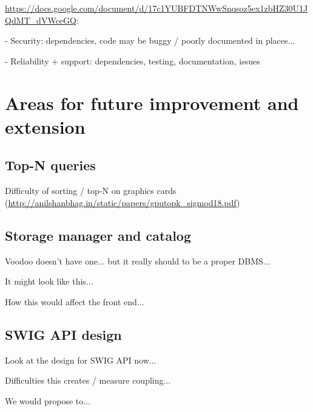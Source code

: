 \url{https://docs.google.com/document/d/17c1YUBFDTNWwSnqsoz5ex1zbHZ30U1JQdMT_dVWceGQ}:

- Security: dependencies, code may be buggy / poorly documented in places...

- Reliability + support: dependencies, testing, documentation, issues

\section{Areas for future improvement and extension}

\subsection{Top-N queries}

Difficulty of sorting / top-N on graphics cards (\url{http://anilshanbhag.in/static/papers/gputopk_sigmod18.pdf})

\subsection{Storage manager and catalog}

Voodoo doesn't have one... but it really should to be a proper DBMS...

It might look like this...

How this would affect the front end...

\subsection{SWIG API design}

Look at the design for SWIG API now...

Difficulties this creates / measure coupling...

We would propose to...
